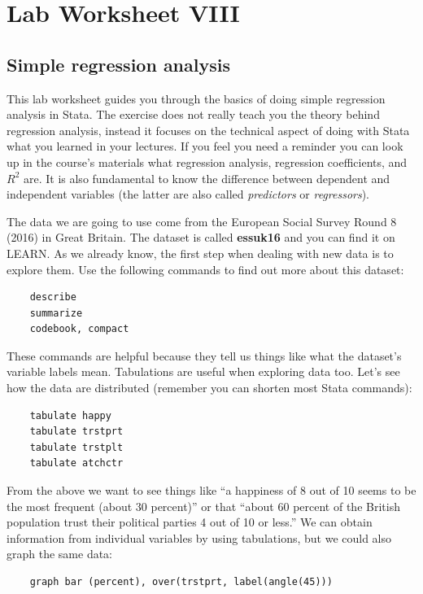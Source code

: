 \section{\hfil Lab Worksheet VIII \hfil}
\subsection*{Simple regression analysis}

This lab worksheet guides you through the basics of doing simple regression analysis in Stata. The exercise does not really teach you the theory behind regression analysis, instead it focuses on the technical aspect of doing with Stata what you learned in your lectures. If you feel you need a reminder you can look up in the course's materials what regression analysis, regression coefficients, and $R^2$ are. It is also fundamental to know the difference between dependent and independent variables (the latter are also called \textit{predictors} or \textit{regressors}).

The data we are going to use come from the European Social Survey Round 8 (2016) in Great Britain. The dataset is called \textbf{essuk16} and you can find it on LEARN. As we already know, the first step when dealing with new data is to explore them. Use the following commands to find out more about this dataset:

\begin{lstlisting}
	describe
	summarize
	codebook, compact
\end{lstlisting}

These commands are helpful because they tell us things like what the dataset's variable labels mean. Tabulations are useful when exploring data too. Let's see how the data are distributed (remember you can shorten most Stata commands):

\begin{lstlisting}
	tabulate happy
	tabulate trstprt
	tabulate trstplt
	tabulate atchctr
\end{lstlisting}

From the above we want to see things like ``a happiness of 8 out of 10 seems to be the most frequent (about 30 percent)'' or that ``about 60 percent of the British population trust their political parties 4 out of 10 or less.'' We can obtain information from individual variables by using tabulations, but we could also graph the same data:

\begin{lstlisting}
	graph bar (percent), over(trstprt, label(angle(45)))
\end{lstlisting}

